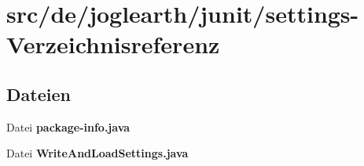 \section{src/de/joglearth/junit/settings-\/\-Verzeichnisreferenz}
\label{dir_33a9e1ba6f2a9dea4499b8f97622f92c}
\subsection*{Dateien}
\begin{DoxyCompactItemize}
\item 
Datei {\bfseries package-\/info.\-java}
\item 
Datei {\bfseries Write\-And\-Load\-Settings.\-java}
\end{DoxyCompactItemize}
